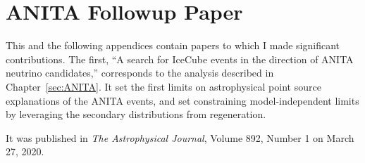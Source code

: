 \chapter{ANITA Followup Paper}
\label{app:ANITA_collaboration_paper}

This and the following appendices contain papers to which I made significant contributions. The first, ``A search for IceCube events in the direction of ANITA neutrino candidates,'' corresponds to the analysis described in Chapter~\ref{sec:ANITA}. It set the first limits on astrophysical point source explanations of the ANITA events, and set constraining model-independent limits by leveraging the secondary \nutau distributions from \nutau regeneration. 

It was published in \textit{The Astrophysical Journal}, Volume 892, Number 1 on March 27, 2020. 

